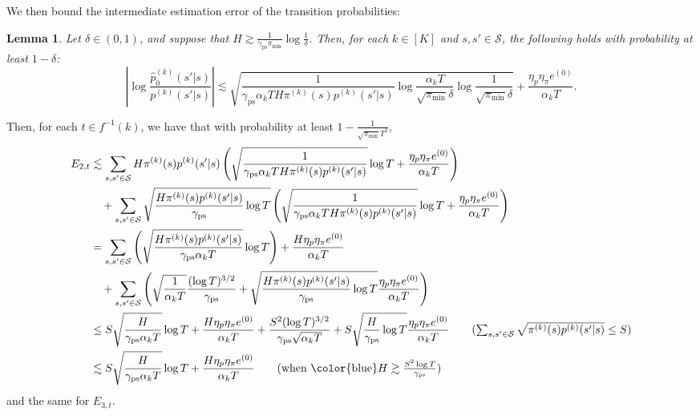 \documentclass[twoside]{article}
\def\gS{{\mathcal{S}}}
\theoremstyle{plain}
\newtheorem{lemma}{Lemma}[section]
\newcommand{\ps}{\mathrm{ps}}
\begin{document}
We then bound the intermediate estimation error of the transition probabilities:
\begin{lemma}
\label{lem:intermediate}
    Let $\delta \in (0, 1)$, and suppose that {\color{blue}$H \gtrsim \frac{1}{\gamma_\ps \pi_{\min}} \log\frac{1}{\delta}$}.
    Then, for each $k \in [K]$ and $s, s' \in \gS$, the following holds with probability at least $1 - \delta$:
    \begin{equation}
        \left| \log\frac{\widehat{p}_0^{(k)}(s' | s)}{p^{(k)}(s' | s)} \right|
        \lesssim \sqrt{\frac{1}{\gamma_\ps \alpha_k T H \pi^{(k)}(s) p^{(k)}(s' | s)} \log\frac{\alpha_k T}{\sqrt{\pi_{\min}} \delta} \log\frac{1}{\sqrt{\pi_{\min}} \delta}} + \frac{\eta_p \eta_\pi e^{(0)}}{\alpha_k T}.
    \end{equation}
\end{lemma}

Then, for each $t \in f^{-1}(k)$, we have that with probability at least $1 - \frac{1}{\sqrt{\pi_{\min}} T^2}$,
\begin{align*}
    E_{2,t} &\lesssim \sum_{s, s' \in \gS} H \pi^{(k)}(s) p^{(k)}(s' | s) \left( \sqrt{\frac{1}{\gamma_\ps \alpha_k T H \pi^{(k)}(s) p^{(k)}(s' | s)}} \log T + \frac{\eta_p \eta_\pi e^{(0)}}{\alpha_k T} \right) \\
    &\quad + \sum_{s, s' \in \gS} \sqrt{\frac{H \pi^{(k)}(s) p^{(k)}(s' | s)}{\gamma_\ps} \log T} \left( \sqrt{\frac{1}{\gamma_\ps \alpha_k T H \pi^{(k)}(s) p^{(k)}(s' | s)}} \log T + \frac{\eta_p \eta_\pi e^{(0)}}{\alpha_k T} \right) \\
    &= \sum_{s, s' \in \gS} \left( \sqrt{\frac{H \pi^{(k)}(s) p^{(k)}(s' | s)}{\gamma_\ps \alpha_k T}} \log T \right) + \frac{H \eta_p \eta_\pi e^{(0)}}{\alpha_k T} \\
    &\quad + \sum_{s, s' \in \gS} \left( \sqrt{\frac{1}{\alpha_k T}} \frac{(\log T)^{3/2}}{\gamma_\ps} + \sqrt{\frac{H \pi^{(k)}(s) p^{(k)}(s' | s)}{\gamma_\ps} \log T} \frac{\eta_p \eta_\pi e^{(0)}}{\alpha_k T} \right) \\
    &\leq S \sqrt{\frac{H}{\gamma_\ps \alpha_k T}} \log T + \frac{H \eta_p \eta_\pi e^{(0)}}{\alpha_k T} + \frac{S^2 (\log T)^{3/2}}{\gamma_\ps \sqrt{\alpha_k T}} + S \sqrt{\frac{H}{\gamma_\ps} \log T} \frac{\eta_p \eta_\pi e^{(0)}}{\alpha_k T} \tag{$\sum_{s, s' \in \gS} \sqrt{\pi^{(k)}(s) p^{(k)}(s' | s)} \leq S$} \\
    &\lesssim S \sqrt{\frac{H}{\gamma_\ps \alpha_k T}} \log T + \frac{H \eta_p \eta_\pi e^{(0)}}{\alpha_k T} \tag{when {\color{blue}$H \gtrsim \frac{S^2 \log T}{\gamma_\ps}$}}
\end{align*}
and the same for $E_{3,t}$.
\end{document}

